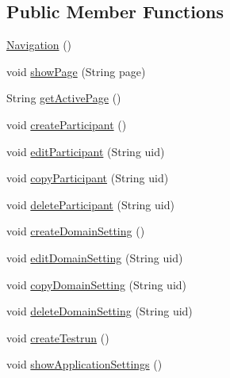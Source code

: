 \subsection*{Public Member Functions}
\begin{DoxyCompactItemize}
\item 
\hyperlink{class_web_analyzer_1_1_u_i_1_1_interaction_objects_1_1_navigation_a7a6fdf1d99ca8e22d46dd21b650ff529}{Navigation} ()
\item 
void \hyperlink{class_web_analyzer_1_1_u_i_1_1_interaction_objects_1_1_navigation_aedf278dac5628e2fbcef79b93611bc20}{show\+Page} (String page)
\item 
String \hyperlink{class_web_analyzer_1_1_u_i_1_1_interaction_objects_1_1_navigation_a1d1e06ac48815c242c36e9a15e02a829}{get\+Active\+Page} ()
\item 
void \hyperlink{class_web_analyzer_1_1_u_i_1_1_interaction_objects_1_1_navigation_a59f689248cdb705afaae4c20a61dd932}{create\+Participant} ()
\item 
void \hyperlink{class_web_analyzer_1_1_u_i_1_1_interaction_objects_1_1_navigation_aa314aff618ac023f460a95c3a9b67268}{edit\+Participant} (String uid)
\item 
void \hyperlink{class_web_analyzer_1_1_u_i_1_1_interaction_objects_1_1_navigation_aaa59afc9d203298ad07213879677ead7}{copy\+Participant} (String uid)
\item 
void \hyperlink{class_web_analyzer_1_1_u_i_1_1_interaction_objects_1_1_navigation_a9decfd16b2f4b9c76ef7b18d4475f3cc}{delete\+Participant} (String uid)
\item 
void \hyperlink{class_web_analyzer_1_1_u_i_1_1_interaction_objects_1_1_navigation_aa873f627156d8e3c60d5ee5a46992add}{create\+Domain\+Setting} ()
\item 
void \hyperlink{class_web_analyzer_1_1_u_i_1_1_interaction_objects_1_1_navigation_a5ece3b16607bfed3fe090e7013785238}{edit\+Domain\+Setting} (String uid)
\item 
void \hyperlink{class_web_analyzer_1_1_u_i_1_1_interaction_objects_1_1_navigation_adef199c82c269af13ff92cfe5ab77d82}{copy\+Domain\+Setting} (String uid)
\item 
void \hyperlink{class_web_analyzer_1_1_u_i_1_1_interaction_objects_1_1_navigation_a6f385b0975781d7c5f709c1b64bbc83d}{delete\+Domain\+Setting} (String uid)
\item 
void \hyperlink{class_web_analyzer_1_1_u_i_1_1_interaction_objects_1_1_navigation_afe97f392f7bbb22c57b40600cefa9b9a}{create\+Testrun} ()
\item 
void \hyperlink{class_web_analyzer_1_1_u_i_1_1_interaction_objects_1_1_navigation_a963d1dcd3e6cd6f191145cb6ce14b21d}{show\+Application\+Settings} ()
\end{DoxyCompactItemize}
